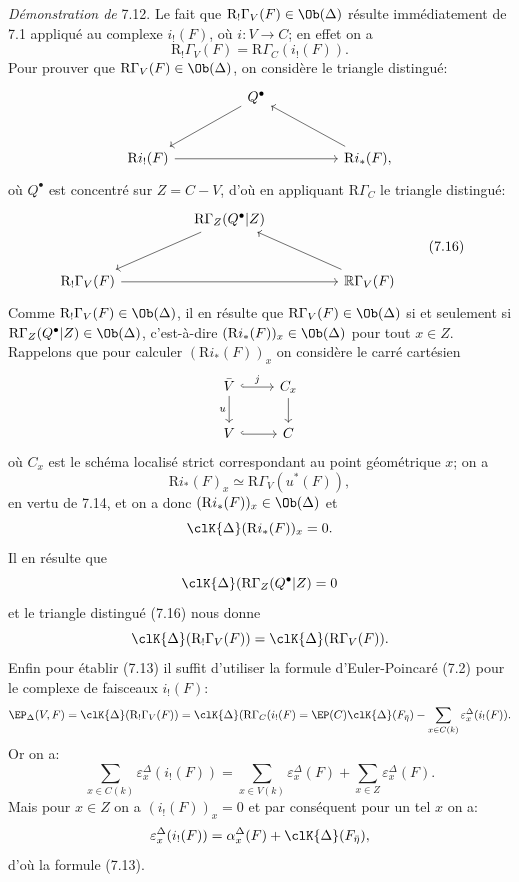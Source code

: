\emph{Démonstration de} 7.12. Le fait que $\mathrm{R}_!\Gamma_V(F)\in\Ob(\Delta)$ résulte immédiatement de 7.1 appliqué au complexe $i_!(F)$, où $i:V\to C$; en effet on a
\[
\mathrm{R}_!\Gamma_V(F)=\mathrm{R}\Gamma_C(i_!(F)).
\]
Pour prouver que $\mathrm{R}\Gamma_V(F)\in\Ob(\Delta)$, on considère le triangle distingué:
\[
\begin{tikzcd}[column sep=huge,row sep=large]
& Q^\bullet \arrow[dl] &\\
\mathrm{R} i_!(F) \arrow[rr] && \mathrm{R} i_*(F) \arrow[ul],
\end{tikzcd}
\]
où $Q^\bullet$ est concentré sur $Z=C-V$, d'où en appliquant $\mathrm{R}\Gamma_C$ le triangle distingué:
\[
\begin{tikzcd}[column sep=huge,row sep=large]
& \mathrm{R}\Gamma_Z(Q^\bullet|Z) \arrow[dl] &\\
\mathrm{R}_!\Gamma_V(F) \arrow[rr] && \mathbb{R}\Gamma_V(F) \arrow[ul]
\end{tikzcd}
\tag{7.16}
\]
Comme $\mathrm{R}_!\Gamma_V(F)\in\Ob(\Delta)$, il en résulte que $\mathrm{R}\Gamma_V(F)\in\Ob(\Delta)$ si et seulement si $\mathrm{R}\Gamma_Z(Q^\bullet|Z)\in\Ob(\Delta)$, c'est-à-dire $(\mathrm{R} i_*(F))_x\in\Ob(\Delta)$ pour tout $x\in Z$. Rappelons que pour calculer $(\mathrm{R} i_*(F))_x$ on considère le carré cartésien
\[
\begin{tikzcd}
\bar V \arrow[r,hook,"j"] \arrow[d,"u"'] & C_x \arrow[d]\\
V \arrow[r,hook] & C
\end{tikzcd}
\]
où $C_x$ est le schéma localisé strict correspondant au point géométrique $x$; on a
\[
\mathrm{R} i_*(F)_x\simeq \mathrm{R}\Gamma_V(u^*(F)),
\]
en vertu de 7.14, et on a 
donc $(\mathrm{R} i_*(F))_x\in\Ob(\Delta)$ et
\[
\clK{\Delta}(\mathrm{R} i_*(F))_x=0.
\]
Il en résulte que
\[
\clK{\Delta}(\mathrm{R}\Gamma_Z(Q^\bullet|Z)=0
\]
et le
triangle distingué (7.16) nous donne
\[
\clK{\Delta}(\mathrm{R}_!\Gamma_V(F))=\clK{\Delta}(\mathrm{R}\Gamma_V(F)).
\]
Enfin pour établir (7.13) il suffit d'utiliser la formule d'Euler-Poincaré (7.2) pour le complexe de faisceaux $i_!(F)$:
\[
\EP_\Delta(V,F)
=
\clK{\Delta}(\mathrm{R}_!\Gamma_V(F))
=
\clK{\Delta}(\mathrm{R}\Gamma_C(i_!(F)
=
\EP(C)\clK{\Delta}(F_{\bar\eta})
-\sum_{x\in C(k)}\varepsilon_x^\Delta(i_!(F)).
\]
Or on a:
\[
\sum_{x\in C(k)}\varepsilon_x^\Delta(i_!(F))
=
\sum_{x\in V(k)}\varepsilon_x^\Delta(F)
+\sum_{x\in Z}\varepsilon_x^\Delta(F).
\]
Mais pour $x\in Z$ on a $(i_!(F))_x=0$ et par conséquent pour un tel $x$ on a:
\[
\varepsilon_x^\Delta(i_!(F))
=
\alpha_x^\Delta(F)+\clK{\Delta}(F_{\bar\eta}),
\]
d'où la formule (7.13).

